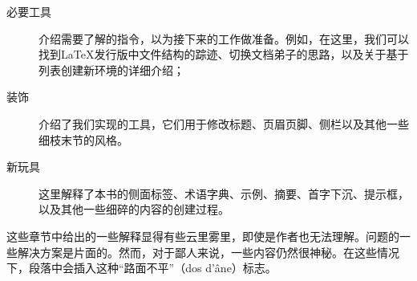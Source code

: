 \begin{description}
    \item[必要工具] 介绍需要了解的指令，以为接下来的工作做准备。例如，在这里，我们可以找到\LaTeX 发行版中文件结构的踪迹、切换文档弟子的思路，以及关于基于列表创建新环境的详细介绍；
    \item[装饰] 介绍了我们实现的工具，它们用于修改标题、页眉页脚、侧栏以及其他一些细枝末节的风格。
    \item[新玩具] 这里解释了本书的侧面标签、术语字典、示例、摘要、首字下沉、提示框，以及其他一些细碎的内容的创建过程。
\end{description}

\begin{qquestion}
这些章节中给出的一些解释显得有些云里雾里，即使是作者也无法理解。问题的一些解决方案是片面的。然而，对于鄙人来说，一些内容仍然很神秘。在这些情况下，段落中会插入这种“路面不平”（dos d'âne）标志。
\end{qquestion}